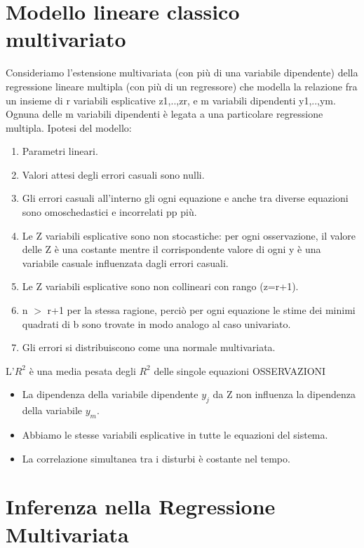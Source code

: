 \documentclass[a4page, 11pt]{article}
\begin{document}
\section{Modello lineare classico multivariato}

Consideriamo l’estensione multivariata (con più di una variabile dipendente) della regressione lineare multipla (con più di un regressore) che modella la relazione fra un insieme di r variabili esplicative z1,..,zr, e m variabili dipendenti y1,..,ym. Ognuna delle m variabili dipendenti è legata a una particolare regressione multipla. 
\newline
\newline
Ipotesi del modello:
\begin{enumerate}[noitemsep]
\item Parametri lineari.
\item Valori attesi degli errori casuali sono nulli.
\item Gli errori casuali all’interno gli ogni equazione e anche tra diverse equazioni sono omoschedastici e incorrelati pp più.
\item Le Z variabili esplicative sono non stocastiche: per ogni osservazione, il valore delle Z è una costante mentre il corrispondente valore di ogni y è una variabile casuale influenzata dagli errori casuali.
\item Le Z variabili esplicative sono non collineari con rango (z=r+1).
\item n $>$ r+1 per la stessa ragione, perciò per ogni equazione le stime dei minimi quadrati di b sono trovate in modo analogo al caso univariato.
\item Gli errori si distribuiscono come una normale multivariata.
\end{enumerate}
L’$R^{2}$ è una media pesata degli $R^{2}$ delle singole equazioni
\newline
\newline
OSSERVAZIONI
\begin{itemize}
\item La dipendenza della variabile dipendente $y_j$ da Z non influenza la dipendenza della variabile $y_m$.
\item Abbiamo le stesse variabili esplicative in tutte le equazioni del sistema.
\item La correlazione simultanea tra i disturbi è costante nel tempo.
\end{itemize}

\section{Inferenza nella Regressione Multivariata}
\end{document}
